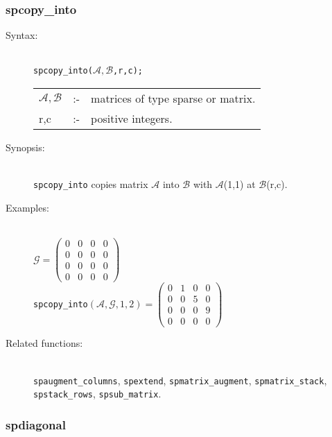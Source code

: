 \subsubsection{spcopy\_into}
\label{sparse:spcopy_into}

\begin{description}
\item[Syntax:]\mbox{}\\
\texttt{spcopy\_into($\mathcal{A,B}$,r,c);}\\[2mm]
\begin{tabular}{l l l}
$\mathcal{A,B}$ &:-& matrices of type sparse or matrix. \\
r,c          &:-& positive integers.
\end{tabular}

\item[Synopsis:]\mbox{}\\
 \texttt{spcopy\_into} copies matrix $\mathcal{A}$ into
                $\mathcal{B}$ with $\mathcal{A}$(1,1) at $\mathcal{B}$(r,c).

\item[Examples:]\mbox{}\\
\(\mathcal{G} = \begin{pmatrix} 0 & 0 & 0 & 0 \\ 0 & 0 & 0 & 0 \\
0 & 0 & 0 & 0 \\ 0 & 0 & 0 & 0
\end{pmatrix}\) \\[2mm]
\texttt{spcopy\_into}\((\mathcal{A,G},1,2)  =
\begin{pmatrix} 0 & 1 & 0 & 0 \\ 0 & 0 & 5 & 0 \\ 0 & 0 & 0
& 9 \\ 0 & 0 & 0 & 0
\end{pmatrix}\)

\item[Related functions:]\mbox{}\\
\texttt{spaugment\_columns}, \texttt{spextend}, \texttt{spmatrix\_augment},
\texttt{spmatrix\_stack}, \texttt{spstack\_rows}, \texttt{spsub\_matrix}.
\end{description}


\subsubsection{spdiagonal}
\label{sparse:spdiagonal}


